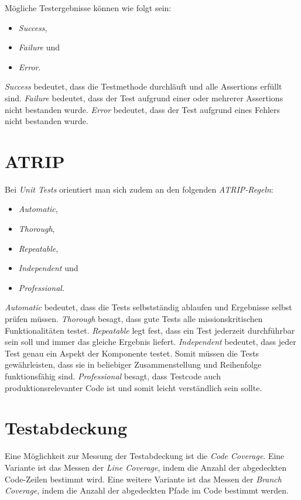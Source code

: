 Mögliche Testergebnisse können wie folgt sein:
\begin{itemize}
    \item \textit{Success},
    \item \textit{Failure} und
    \item \textit{Error}.
\end{itemize}

\textit{Success} bedeutet, dass die Testmethode durchläuft und alle Assertions erfüllt sind.
\textit{Failure} bedeutet, dass der Test aufgrund einer oder mehrerer Assertions nicht bestanden wurde.
\textit{Error} bedeutet, dass der Test aufgrund eines Fehlers nicht bestanden wurde.

\section{ATRIP}
Bei \textit{Unit Tests} orientiert man sich zudem an den folgenden \textit{ATRIP-Regeln}:
\begin{itemize}
    \item \textit{Automatic},
    \item \textit{Thorough},
    \item \textit{Repeatable},
    \item \textit{Independent} und
    \item \textit{Professional}.
\end{itemize}

\textit{Automatic} bedeutet, dass die Tests selbstständig ablaufen und Ergebnisse selbst prüfen müssen.
\textit{Thorough} besagt, dass gute Tests alle missionskritischen Funktionalitäten testet.
\textit{Repeatable} legt fest, dass ein Test jederzeit durchführbar sein soll und immer das gleiche Ergebnis liefert.
\textit{Independent} bedeutet, dass jeder Test genau ein Aspekt der Komponente testet.
Somit müssen die Tests gewährleisten, dass sie in beliebiger Zusammenstellung und Reihenfolge funktionsfähig sind.
\textit{Professional} besagt, dass Testcode auch produktionsrelevanter Code ist und somit leicht verständlich sein sollte.

\section{Testabdeckung}
Eine Möglichkeit zur Messung der Testabdeckung ist die \textit{Code Coverage}.
Eine Variante ist das Messen der \textit{Line Coverage}, indem die Anzahl der abgedeckten Code-Zeilen bestimmt wird.
Eine weitere Variante ist das Messen der \textit{Branch Coverage}, indem die Anzahl der abgedeckten Pfade im Code bestimmt werden.

